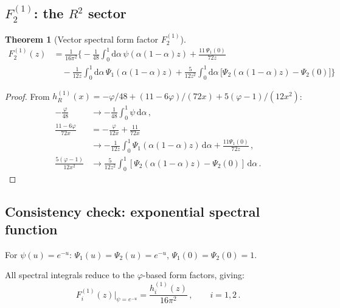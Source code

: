 \documentclass[11pt,a4paper]{article}
\newcommand{\dd}{\mathrm{d}}
\newtheorem{theorem}{Theorem}[section]
\theoremstyle{definition}
\theoremstyle{remark}
\begin{document}
\subsection{$F_2^{(1)}$: the $R^2$ sector}

\begin{theorem}[Vector spectral form factor $F_2^{(1)}$]
\label{thm:F2}
\begin{equation}
  \boxed{
  \begin{aligned}
  F_2^{(1)}(z) &= \frac{1}{16\pi^2}\Biggl\{
    -\frac{1}{48}\int_0^1\!\dd\alpha\,\psi(\alpha(1-\alpha)z)
    + \frac{11\,\Psi_1(0)}{72z}\\
  &\quad
    - \frac{1}{12z}\int_0^1\!\dd\alpha\,\Psi_1(\alpha(1-\alpha)z)
    + \frac{5}{12z^2}\int_0^1\!\dd\alpha\,
      \bigl[\Psi_2(\alpha(1-\alpha)z) - \Psi_2(0)\bigr]
  \Biggr\}
  \end{aligned}
  }
  \label{eq:F2}
\end{equation}
\end{theorem}

\begin{proof}
From $h_R^{(1)}(x) = -\varphi/48 + (11-6\varphi)/(72x)
+ 5(\varphi-1)/(12x^2)$:
\begin{align*}
  -\frac{\varphi}{48} &\to -\frac{1}{48}\int_0^1\psi\,\dd\alpha\,,\\
  \frac{11-6\varphi}{72x} &= -\frac{\varphi}{12x}
  + \frac{11}{72x}\\
  &\to -\frac{1}{12z}\int_0^1\Psi_1(\alpha(1-\alpha)z)\,\dd\alpha
  + \frac{11\Psi_1(0)}{72z}\,,\\
  \frac{5(\varphi-1)}{12x^2} &\to
  \frac{5}{12z^2}\int_0^1[\Psi_2(\alpha(1-\alpha)z) - \Psi_2(0)]\,\dd\alpha\,.
\end{align*}
\end{proof}


\subsection{Consistency check: exponential spectral function}

For $\psi(u) = e^{-u}$: $\Psi_1(u) = \Psi_2(u) = e^{-u}$,
$\Psi_1(0) = \Psi_2(0) = 1$.

All spectral integrals reduce to the $\varphi$-based form factors,
giving:
\begin{equation}
  F_i^{(1)}(z)\Big|_{\psi=e^{-u}}
  = \frac{h_i^{(1)}(z)}{16\pi^2}\,,\qquad i = 1, 2\,.
  \label{eq:exp-check}
\end{equation}
\end{document}

